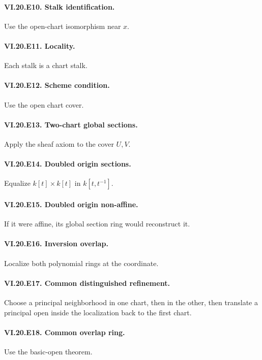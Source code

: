 \paragraph{VI.20.E10. Stalk identification.} Use the open-chart isomorphism near $x$.

\paragraph{VI.20.E11. Locality.} Each stalk is a chart stalk.

\paragraph{VI.20.E12. Scheme condition.} Use the open chart cover.

\paragraph{VI.20.E13. Two-chart global sections.} Apply the sheaf axiom to the cover $U,V$.

\paragraph{VI.20.E14. Doubled origin sections.} Equalize $k[t]\times k[t]$ in $k[t,t^{-1}]$.

\paragraph{VI.20.E15. Doubled origin non-affine.} If it were affine, its global section ring would reconstruct it.

\paragraph{VI.20.E16. Inversion overlap.} Localize both polynomial rings at the coordinate.

\paragraph{VI.20.E17. Common distinguished refinement.} Choose a principal neighborhood in one chart, then in the other, then translate a principal open inside the localization back to the first chart.

\paragraph{VI.20.E18. Common overlap ring.} Use the basic-open theorem.

